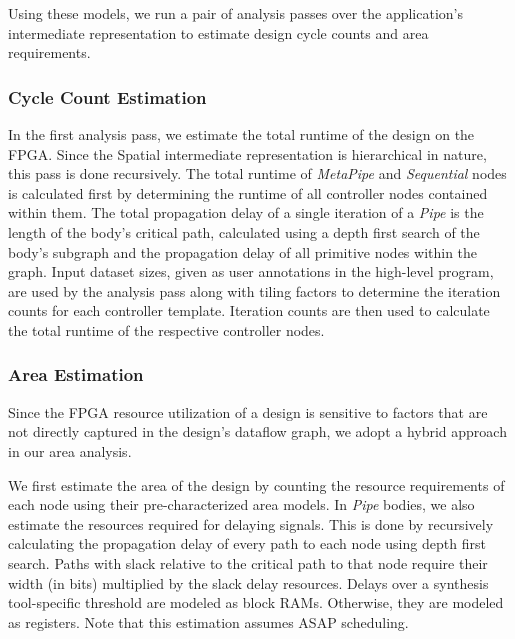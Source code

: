 Using these models, we run a pair of analysis passes over the application's intermediate representation to estimate design cycle counts and area requirements.

\subsubsection{Cycle Count Estimation}
In the first analysis pass, we estimate the total runtime of the design on the FPGA.
Since the Spatial intermediate representation is hierarchical in nature, this pass is done recursively.
The total runtime of \emph{MetaPipe} and \emph{Sequential} nodes is calculated first by determining
the runtime of all controller nodes contained within them. The total propagation delay of a single
iteration of a \emph{Pipe} is the length of the body's critical path, calculated using a depth first
search of the body's subgraph and the propagation delay of all primitive nodes within the graph.
Input dataset sizes, given as user annotations in the high-level program, are used by the analysis pass
along with tiling factors to determine the iteration counts for each controller template.
Iteration counts are then used to calculate the total runtime of the respective controller nodes. %


\subsubsection{Area Estimation}
Since the FPGA resource utilization of a design is sensitive to factors that are not directly captured
in the design's dataflow graph, we adopt a hybrid approach in our area analysis.

We first estimate the area of the design by counting the resource
requirements of each node using their pre-characterized area models. In \emph{Pipe} bodies, we also
estimate the resources required for delaying signals. This is done by recursively calculating the
propagation delay of every path to each node using depth first search. Paths with slack relative to
the critical path to that node require their width (in bits) multiplied by the slack delay resources.
Delays over a synthesis tool-specific threshold are modeled as block RAMs.
Otherwise, they are modeled as registers. Note that this estimation assumes ASAP scheduling.

